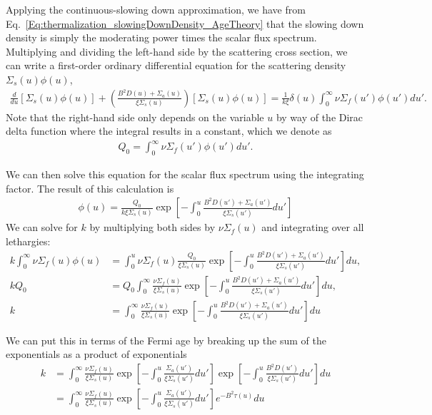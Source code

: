Applying the continuous-slowing down approximation, we have from Eq.~\eqref{Eq:thermalization_slowingDownDensity_AgeTheory} that the slowing down density is simply the moderating power times the scalar flux spectrum. Multiplying and dividing the left-hand side by the scattering cross section, we can write a first-order ordinary differential equation for the scattering density $\Sigma_s(u) \phi(u)$,
\begin{align}
  \frac{d}{du} [ \Sigma_s(u) \phi(u) ] + \left( \frac{B^2 D(u) + \Sigma_a(u)}{\xi \Sigma_s(u)} \right) [ \Sigma_s(u) \phi(u) ] = \frac{1}{k \xi} \delta(u) \int_0^\infty \nu\Sigma_f(u') \phi(u') du'. 
\end{align}
Note that the right-hand side only depends on the variable $u$ by way of the Dirac delta function where the integral results in a constant, which we denote as
\begin{align}
  Q_0 = \int_0^\infty \nu\Sigma_f(u') \phi(u') du'.
\end{align}

We can then solve this equation for the scalar flux spectrum using the integrating factor. The result of this calculation is
\begin{align}
  \phi(u) = \frac{ Q_0 }{ k \xi \Sigma_s(u) } \exp\left[ -\int_0^u \frac{B^2 D(u') + \Sigma_a(u')}{\xi \Sigma_s(u')} du' \right]
\end{align}
We can solve for $k$ by multiplying both sides by $\nu\Sigma_f(u)$ and integrating over all lethargies:
\begin{align}
  k \int_0^\infty \nu\Sigma_f(u) \phi(u) &= \int_0^u \nu\Sigma_f(u) \frac{ Q_0 }{ \xi \Sigma_s(u) } \exp\left[ -\int_0^u \frac{B^2 D(u') + \Sigma_a(u')}{\xi \Sigma_s(u')} du' \right] du, \nonumber \\
  k Q_0 &= Q_0 \int_0^\infty  \frac{ \nu\Sigma_f(u)}{ \xi \Sigma_s(u) } \exp\left[ -\int_0^u \frac{B^2 D(u') + \Sigma_a(u')}{\xi \Sigma_s(u')} du' \right] du , \nonumber \\
  k &= \int_0^\infty  \frac{ \nu\Sigma_f(u)}{ \xi \Sigma_s(u) } \exp\left[ -\int_0^u \frac{B^2 D(u') + \Sigma_a(u')}{\xi \Sigma_s(u')} du' \right] du
\end{align}

We can put this in terms of the Fermi age by breaking up the sum of the exponentials as a product of exponentials
\begin{align}
  k &= \int_0^\infty  \frac{ \nu\Sigma_f(u)}{ \xi \Sigma_s(u) } \exp\left[ -\int_0^u \frac{\Sigma_a(u')}{\xi \Sigma_s(u')} du' \right] \exp\left[ -\int_0^u \frac{B^2 D(u')}{\xi \Sigma_s(u')} du'  \right]  du \nonumber \\
    &= \int_0^\infty  \frac{ \nu\Sigma_f(u) }{ \xi \Sigma_s(u) } \exp\left[ -\int_0^u \frac{\Sigma_a(u')}{\xi \Sigma_s(u')} du' \right] e^{-B^2\tau(u)} du
\end{align}

